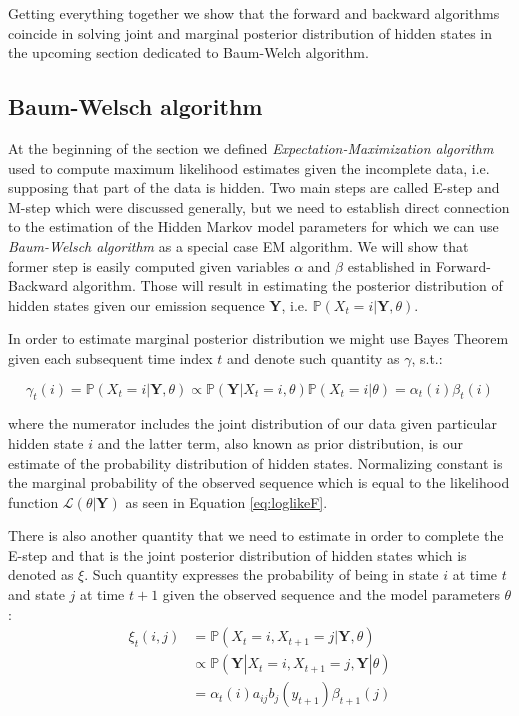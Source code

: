 Getting everything together we show that the forward and backward algorithms coincide in solving joint and marginal posterior distribution 
of hidden states in the upcoming section dedicated to Baum-Welch algorithm.

\subsection{Baum-Welsch algorithm}

At the beginning of the section we defined \textit{Expectation-Maximization algorithm} used to compute maximum likelihood estimates given the incomplete data, 
i.e. supposing that part of the data is hidden. Two main steps are called E-step and M-step which were discussed generally, 
but we need to establish direct connection to the estimation of the Hidden Markov model parameters for which we can use  \textit{Baum-Welsch algorithm} as a special case EM algorithm.
We will show that former step is easily computed given variables $\alpha$ and $\beta$ established in Forward-Backward algorithm. 
Those will result in estimating the posterior distribution of hidden states given our emission sequence \textbf{Y}, i.e. $\mathbb{P}(X_t=i|\textbf{Y},\theta)$. \citep{Rabiner1989}

In order to estimate marginal posterior distribution we might use Bayes Theorem given each subsequent time index $t$ and denote such quantity as $\gamma$, s.t.: 

\begin{equation} \label{eq:gamma}
    \gamma_t(i) = \mathbb{P}(X_t=i|\textbf{Y},\theta) \propto \mathbb{P}(\textbf{Y}|X_t=i, \theta) \mathbb{P}(X_t = i|\theta) = \alpha_t(i) \beta_t(i)
\end{equation}

where the numerator includes the joint distribution of our data given particular hidden state $i$ and the latter term, also known as prior distribution, 
is our estimate of the probability distribution of hidden states. Normalizing constant is the marginal probability of the observed sequence 
which is equal to the likelihood function $\mathcal{L}(\theta|\textbf{Y})$ as seen in Equation \ref{eq:loglikeF}.

There is also another quantity that we need to estimate in order to complete the E-step and that is the joint posterior distribution of hidden states which is denoted as $\xi$.
Such quantity expresses the probability of being in state $i$ at time $t$ and state $j$ at time $t+1$ given the observed sequence and the model parameters $\theta$:
\begin{align} \label{eq:xi}
    \xi_t(i,j) & = \mathbb{P}(X_t=i, X_{t+1}=j|\textbf{Y},\theta) \\ \nonumber
               & \propto \mathbb{P}(\textbf{Y}|X_t=i, X_{t+1}=j,\textbf{Y}|\theta) \\ \nonumber
               & = \alpha_t(i) a_{ij} b_j(y_{t+1}) \beta_{t+1}(j)
\end{align}

